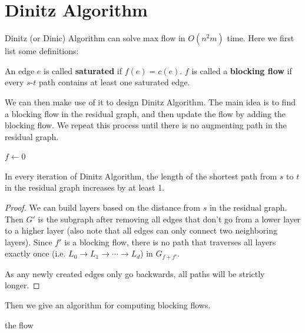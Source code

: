 

\section{Dinitz Algorithm}

Dinitz (or Dinic) Algorithm can solve max flow in $O(n^2 m)$ time. Here we first list some definitions:

\begin{definition}
	An edge $e$ is called \textbf{saturated} if $f(e) = c(e)$. $f$ is called a \textbf{blocking flow} if every $s$-$t$ path contains at least one saturated edge.
\end{definition}

We can then make use of it to design Dinitz Algorithm. The main idea is to find a blocking flow in the residual graph, and then update the flow by adding the blocking flow. We repeat this process until there is no augmenting path in the residual graph.

\begin{algorithm}
	$f\gets 0$\;
	\;
	\caption{Dinitz Algorithm}\label{alg:dinitz}
\end{algorithm}

\begin{lemma}
	In every iteration of Dinitz Algorithm, the length of the shortest path from $s$ to $t$ in the residual graph increases by at least 1.
\end{lemma}
\begin{proof}
	We can build layers based on the distance from $s$ in the residual graph. Then $G'$ is the subgraph after removing all edges that don't go from a lower layer to a higher layer (also note that all edges can only connect two neighboring layers). Since $f'$ is a blocking flow, there is no path that traverses all layers exactly once (i.e. $L_0 \to L_1 \to \cdots \to L_d$) in $G_{f+f'}$.

	As any newly created edges only go backwards, all paths will be strictly longer.
\end{proof}

Then we give an algorithm for computing blocking flows.

\begin{algorithm}[H]
	\Return the flow\;
	\caption{Blocking Flow Algorithm}\label{alg:blocking}
\end{algorithm}

